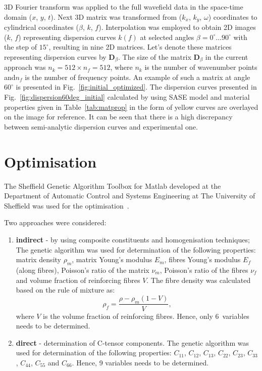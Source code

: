 \documentclass[preprint,12pt]{elsarticle}
\newcommand{\matr}[1]{\mathbf{#1}} %
\begin{document}
3D Fourier transform was applied to the full wavefield data in the space-time domain 
(\(x\), \(y\), \(t\)). Next 3D matrix was transformed from (\(k_x\), \(k_y\), \(\omega\)) 
coordinates to cylindrical coordinates (\(\beta\), \(k\), \(f\)). Interpolation was employed 
to 
obtain 2D images (\(k\), \(f\)) representing dispersion curves \(k(f)\) at selected angles 
\(\beta = 0^{\circ} \ldots 90^{\circ}\) with the step of \(15^{\circ}\), resulting in nine 2D 
matrices. Let's denote these matrices representing dispersion curves by 
\(\matr{D}_{\beta}\). The size of the matrix  \(\matr{D}_{\beta}\) in the current approach 
was \(n_k=512 \times n_f= 512\), where \(n_k\) is the number of wavenumber points 
and\(n_f\) is the number of frequency points.  An example of such a matrix at angle \( 
60^{\circ}\) is presented in Fig.~\ref{fig:initial_optimized}. The dispersion curves 
presented in Fig.~\ref{fig:dispersion60deg_initial} calculated by using SASE model and 
material properties given in Table~\ref{tab:matprop} in the form of yellow curves are 
overlayed on the image for reference. It can be seen that there is a high discrepancy 
between semi-analytic dispersion curves and experimental one. 
	\section{Optimisation \label{sec:optimization}}
	The Sheffield Genetic Algorithm Toolbox for Matlab developed at the Department of Automatic Control and Systems Engineering at The University of Sheffield was used for the optimisation~\cite{Chipperfield1994}.
	
	Two approaches were considered:
	\begin{enumerate}
		\item \textbf{indirect} - by using composite constituents and homogenisation techniques;
		The genetic algorithm was used for determination of the following properties:  
		matrix density \(\rho_m\), matrix Young's modulus \(E_m\), fibres Young's modulus 
		\(E_f\) (along fibres), Poisson's ratio of the matrix \(\nu_m\), Poisson's ratio of the 
		fibres \(\nu_f\) and volume fraction of reinforcing fibres \(V\).  The fibre density was 
		calculated based on the rule of mixture as:
		\begin{equation}
		\rho_f = \frac{\rho - \rho_m (1-V)}{V},
		\end{equation}
		where \(V\) is the volume fraction of reinforcing fibres. Hence, only 6~variables 
		needs to be determined.
		\item \textbf{direct} - determination of C-tensor components.
		The genetic algorithm was used for determination of the following properties: 
		\(C_{11}\), \(C_{12}\), \(C_{13}\),  \(C_{22}\), \(C_{23}\), \(C_{33}\), \(C_{44}\), 
		\(C_{55}\) and \(C_{66}\). Hence, 9 variables needs to be determined.
	\end{enumerate}
\end{document}
